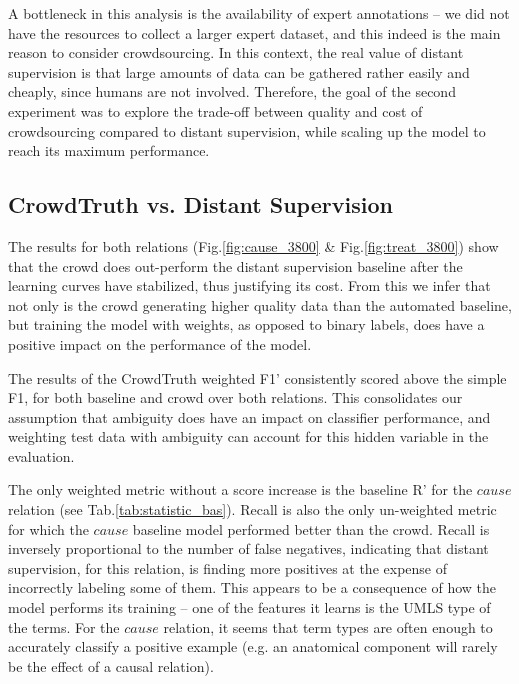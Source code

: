 A bottleneck in this analysis is the availability of expert annotations -- we did not have the resources to collect a larger expert dataset, and this indeed is the main reason to consider crowdsourcing. In this context, the real value of distant supervision is that large amounts of data can be gathered rather easily and cheaply, since humans are not involved. Therefore, the goal of the second experiment was to explore the trade-off between quality and cost of crowdsourcing compared to distant supervision, while scaling up the model to reach its maximum performance.

\subsection{CrowdTruth vs. Distant Supervision}
\label{sec:ct-ds}

The results for both relations (Fig.\ref{fig:cause_3800} \& Fig.\ref{fig:treat_3800}) show that the crowd does out-perform the distant supervision baseline after the learning curves have stabilized, thus justifying its cost. From this we infer that not only is the crowd generating higher quality data than the automated baseline, but training the model with weights, as opposed to binary labels, does have a positive impact on the performance of the model.

The results of the CrowdTruth weighted F1' consistently scored above the simple F1, for both baseline and crowd over both relations.  This consolidates our assumption that ambiguity does have an impact on classifier performance, and weighting test data with ambiguity can account for this hidden variable in the evaluation.

The only weighted metric without a score increase is the baseline R' for the $cause$ relation (see Tab.\ref{tab:statistic_bas}). Recall is also the only un-weighted metric for which the $cause$ baseline model performed better than the crowd. Recall is inversely proportional to the number of false negatives, indicating that distant supervision, for this relation, is finding more positives at the expense of incorrectly labeling some of them.  This appears to be a consequence of how the model performs its training -- one of the features it learns is the UMLS type of the terms. For the $cause$ relation, it seems that term types are often enough to accurately classify a positive example (e.g. an anatomical component will rarely be the effect of a causal relation).

